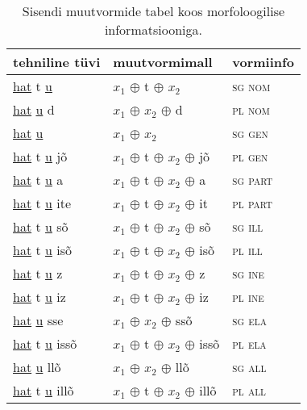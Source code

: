 \documentclass[12pt,a4paper]{article}
\begin{document}
\begin{table}[H]
\begin{minipage}[t]{.40\textwidth}
    \caption{Sisendi muutvormide tabel koos morfo\-loogilise informatsiooniga.}
    \label{tab:sisendtabel-katto}
  \end{minipage}
  \hfill
  \begin{minipage}[t]{.55\textwidth}
    \centering
    \begin{tabular}[t]{l l l}
      tehniline tüvi                     & muutvormi\-mall           & vormiinfo \\
      \hline
      \underline{hat} t \underline{u}       & $x_1$ $\oplus$ t $\oplus$ $x_2$         & \textsc{sg nom} \\
      \underline{hat}   \underline{u} d     & $x_1$ $\oplus$ $x_2$ $\oplus$ d         & \textsc{pl nom} \\
      \underline{hat}   \underline{u}       & $x_1$ $\oplus$ $x_2$             & \textsc{sg gen} \\
      \underline{hat} t \underline{u} jõ    & $x_1$ $\oplus$ t $\oplus$ $x_2$ $\oplus$ jõ    & \textsc{pl gen} \\
      \underline{hat} t \underline{u} a     & $x_1$ $\oplus$ t $\oplus$ $x_2$ $\oplus$ a     & \textsc{sg part} \\
      \underline{hat} t \underline{u} ite   & $x_1$ $\oplus$ t $\oplus$ $x_2$ $\oplus$ it    & \textsc{pl part} \\
      \underline{hat} t \underline{u} sõ    & $x_1$ $\oplus$ t $\oplus$ $x_2$ $\oplus$ sõ    & \textsc{sg ill} \\
      \underline{hat} t \underline{u} isõ   & $x_1$ $\oplus$ t $\oplus$ $x_2$ $\oplus$ isõ   & \textsc{pl ill} \\
      \underline{hat} t \underline{u} z     & $x_1$ $\oplus$ t $\oplus$ $x_2$ $\oplus$ z     & \textsc{sg ine} \\
      \underline{hat} t \underline{u} iz    & $x_1$ $\oplus$ t $\oplus$ $x_2$ $\oplus$ iz    & \textsc{pl ine} \\
      \underline{hat}   \underline{u} sse   & $x_1$ $\oplus$ $x_2$ $\oplus$ ssõ       & \textsc{sg ela} \\
      \underline{hat} t \underline{u} issõ  & $x_1$ $\oplus$ t $\oplus$ $x_2$ $\oplus$ issõ  & \textsc{pl ela} \\
      \underline{hat}   \underline{u} llõ   & $x_1$ $\oplus$ $x_2$ $\oplus$ llõ       & \textsc{sg all} \\
      \underline{hat} t \underline{u} illõ  & $x_1$ $\oplus$ t $\oplus$ $x_2$ $\oplus$ illõ  & \textsc{pl all} \\

\end{tabular}
\end{minipage}
\end{table}
\end{document}
